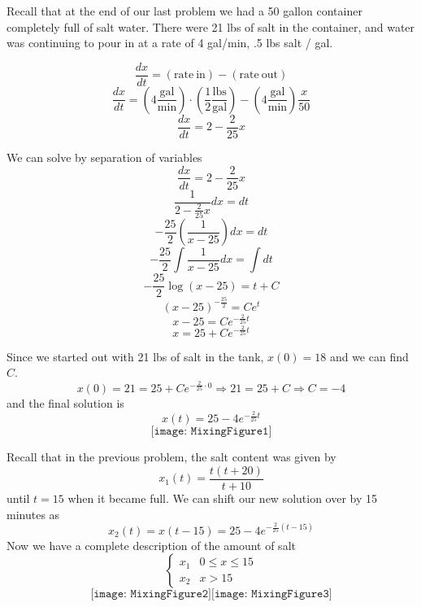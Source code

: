 \documentclass[11pt]{article}
\begin{document}

Recall that at the end of our last problem we had a 50 gallon container completely full of salt water. There were 21 lbs of salt in the container, and water was continuing to pour in at a rate of 4 gal/min, .5 lbs salt / gal. 

\[\frac{dx}{dt} = (\mathrm{rate\ in}) - (\mathrm{rate\ out})\]
\[\frac{dx}{dt} = \left( 4 \frac{\mathrm{gal}}{\mathrm{min}}\right) \cdot \left( \frac{1}{2} \frac{\mathrm{lbs}}{\mathrm{gal}} \right)- \left( 4 \frac{\mathrm{gal}}{\mathrm{min}}\right)  \frac{x}{50}\]
\[\frac{dx}{dt} = 2 - \frac{2}{25} x\]

We can solve by separation of variables
\[\frac{dx}{dt} = 2 - \frac{2}{25} x\]
\[\frac{1}{2 - \frac{2}{25} x } dx = dt\]
\[- \frac{25}{2} \left( \frac{1}{  x - 25 } \right) dx = dt\]
\[- \frac{25}{2}  \int \frac{1}{  x - 25 }  dx = \int dt\]
\[- \frac{25}{2} \log (  x - 25 )   = t + C\]
\[  (  x - 25 )^{- \frac{25}{2}}   =  Ce^t\]
\[   x - 25   =  Ce^{- \frac{2}{25} t } \]
\[   x = 25 +  Ce^{- \frac{2}{25} t } \]

Since we started out with 21 lbs of salt in the tank, $x(0) = 18$ and we can find $C$.
\[   x(0)=21  = 25 +  Ce^{- \frac{2}{25} \cdot 0 } \Rightarrow 21 = 25 + C \Rightarrow C = -4\]
and the final solution is
\[x(t) = 25 - 4 e ^{- \frac{2}{25} t } \]
\[\texttt{[image: MixingFigure1]}\]






Recall that in the previous problem, the salt content was given by 
\[x_1(t) = \frac{t(t+20)}{t+10}\]
until $t=15$ when it became full. We can shift our new solution over by 15 minutes as
\[x_2(t) = x(t-15) = 25 - 4e ^{-\frac{2}{25} (t-15)}\]
Now we have a complete description of the amount of salt
\[\left\{ \begin{array}{ll} x_1 & 0 \leq x \leq 15 \\ x_2 & x> 15 \end{array}\right.\]
\[\texttt{[image: MixingFigure2]}\texttt{[image: MixingFigure3]}\]
\end{document}
